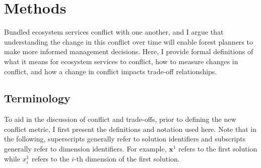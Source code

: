 \section{Methods}
\label{sec:methods}
%
%

Bundled ecosystem services conflict with one another, and I argue that understanding the change in this conflict over time will enable forest planners to make more informed management decisions. Here, I provide formal definitions of what it means for ecosystem services to conflict, how to measure changes in conflict, and how a change in conflict impacts trade-off relationships.

\subsection{Terminology}
To aid in the discussion of conflict and trade-offs, prior to defining the new conflict metric, I first present the definitions and notation used here. Note that in the following, superscripts generally refer to solution identifiers and subscripts generally refer to dimension identifiers. For example, $\mathbf{x}^1$ refers to the first solution while $x^1_i$ refers to the $i$-th dimension of the first solution.

\label{subsec:terminology}
